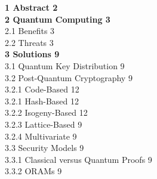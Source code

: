 \documentclass[a4paper,11pt]{article}
\begin{document}
\noindent
\textbf{1 Abstract \hfill 2}\\[0,5cm]
\textbf{2 Quantum Computing \hfill 3}\\[0,3cm]
	\hspace*{0,5cm}2.1 Benefits \hfill 3\\[0,3cm]
	\hspace*{0,5cm}2.2 Threats \hfill 3\\[0,3cm]
\textbf{3 Solutions \hfill 9}\\[0,3cm]
	\hspace*{0,5cm}3.1 Quantum Key Distribution \hfill 9\\[0,3cm]
	\hspace*{0,5cm}3.2 Post-Quantum Cryptography \hfill 9\\[0,3cm]
		\hspace*{1cm}3.2.1 Code-Based \hfill 12\\[0,3cm]
		\hspace*{1cm}3.2.1 Hash-Based \hfill 12\\[0,3cm]
		\hspace*{1cm}3.2.2 Isogeny-Based \hfill 12\\[0,3cm]
		\hspace*{1cm}3.2.3 Lattice-Based \hfill 9\\[0,3cm]
		\hspace*{1cm}3.2.4 Multivariate \hfill 9\\[0,3cm]
	\hspace*{0,5cm}3.3 Security Models \hfill 9\\[0,3cm]
		\hspace*{1cm}3.3.1 Classical versus Quantum Proofs \hfill 9\\[0,3cm]
		\hspace*{1cm}3.3.2 ORAMs \hfill 9\\[0,3cm]


\newpage
\setlength{\columnsep}{30pt}
\end{document}
